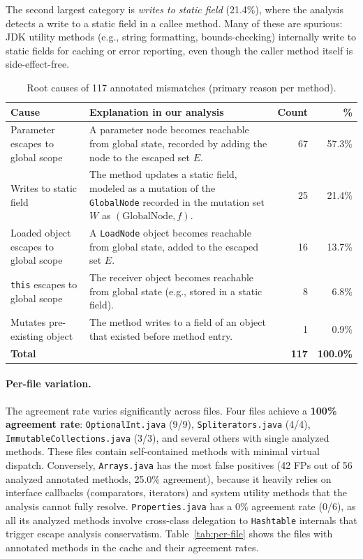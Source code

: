 The second largest category is \emph{writes to static field} (21.4\%), where the analysis detects a write to a static field in a callee method.
Many of these are spurious: JDK utility methods (e.g., string formatting, bounds-checking) internally write to static fields for caching or error reporting, even though the caller method itself is side-effect-free.

\begin{table}[h]
\centering
\caption{Root causes of 117 annotated mismatches (primary reason per method).}
\label{tab:fp-causes}
\begin{tabular}{lp{7.5cm}rr}
\toprule
\textbf{Cause} & \textbf{Explanation in our analysis} & \textbf{Count} & \textbf{\%} \\
\midrule
Parameter escapes to global scope
& A parameter node becomes reachable from global state, recorded by adding the node to the escaped set $E$.
& 67 & 57.3\% \\

Writes to static field
& The method updates a static field, modeled as a mutation of the \texttt{GlobalNode} recorded in the mutation set $W$ as $(\text{GlobalNode}, f)$.
& 25 & 21.4\% \\

Loaded object escapes to global scope
& A \texttt{LoadNode} object becomes reachable from global state, added to the escaped set $E$.
& 16 & 13.7\% \\

\texttt{this} escapes to global scope
& The receiver object becomes reachable from global state (e.g., stored in a static field).
& 8 & 6.8\% \\

Mutates pre-existing object
& The method writes to a field of an object that existed before method entry.
& 1 & 0.9\% \\

\midrule
\textbf{Total} & & \textbf{117} & \textbf{100.0\%} \\
\bottomrule
\end{tabular}
\end{table}

\paragraph{Per-file variation.}
The agreement rate varies significantly across files.
Four files achieve a \textbf{100\% agreement rate}: \texttt{OptionalInt.java} (9/9), \texttt{Spliterators.java} (4/4), \texttt{ImmutableCollections.java} (3/3), and several others with single analyzed methods.
These files contain self-contained methods with minimal virtual dispatch.
Conversely, \texttt{Arrays.java} has the most false positives (42 FPs out of 56 analyzed annotated methods, 25.0\% agreement), because it heavily relies on interface callbacks (comparators, iterators) and system utility methods that the analysis cannot fully resolve.
\texttt{Properties.java} has a 0\% agreement rate (0/6), as all its analyzed methods involve cross-class delegation to \texttt{Hashtable} internals that trigger escape analysis conservatism.
Table~\ref{tab:per-file} shows the files with annotated methods in the cache and their agreement rates.

